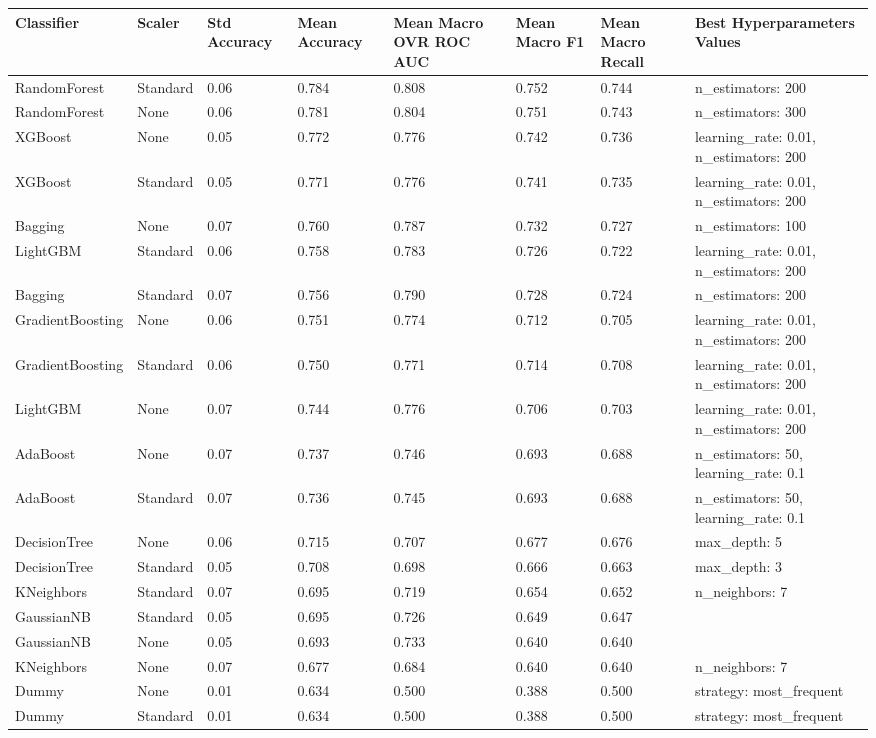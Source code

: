 \begin{tabular}{llllllll}
\toprule
Classifier & Scaler & Std Accuracy & Mean Accuracy & Mean Macro OVR ROC AUC & Mean Macro F1 & Mean Macro Recall & Best Hyperparameters Values \\
\midrule
RandomForest & Standard & 0.06 & 0.784 & 0.808 & 0.752 & 0.744 & {{n\_estimators: 200}} \\
RandomForest & None & 0.06 & 0.781 & 0.804 & 0.751 & 0.743 & {{n\_estimators: 300}} \\
XGBoost & None & 0.05 & 0.772 & 0.776 & 0.742 & 0.736 & {{learning\_rate: 0.01,  n\_estimators: 200}} \\
XGBoost & Standard & 0.05 & 0.771 & 0.776 & 0.741 & 0.735 & {{learning\_rate: 0.01,  n\_estimators: 200}} \\
Bagging & None & 0.07 & 0.760 & 0.787 & 0.732 & 0.727 & {{n\_estimators: 100}} \\
LightGBM & Standard & 0.06 & 0.758 & 0.783 & 0.726 & 0.722 & {{learning\_rate: 0.01,  n\_estimators: 200}} \\
Bagging & Standard & 0.07 & 0.756 & 0.790 & 0.728 & 0.724 & {{n\_estimators: 200}} \\
GradientBoosting & None & 0.06 & 0.751 & 0.774 & 0.712 & 0.705 & {{learning\_rate: 0.01,  n\_estimators: 200}} \\
GradientBoosting & Standard & 0.06 & 0.750 & 0.771 & 0.714 & 0.708 & {{learning\_rate: 0.01,  n\_estimators: 200}} \\
LightGBM & None & 0.07 & 0.744 & 0.776 & 0.706 & 0.703 & {{learning\_rate: 0.01,  n\_estimators: 200}} \\
AdaBoost & None & 0.07 & 0.737 & 0.746 & 0.693 & 0.688 & {{n\_estimators: 50,  learning\_rate: 0.1}} \\
AdaBoost & Standard & 0.07 & 0.736 & 0.745 & 0.693 & 0.688 & {{n\_estimators: 50,  learning\_rate: 0.1}} \\
DecisionTree & None & 0.06 & 0.715 & 0.707 & 0.677 & 0.676 & {{max\_depth: 5}} \\
DecisionTree & Standard & 0.05 & 0.708 & 0.698 & 0.666 & 0.663 & {{max\_depth: 3}} \\
KNeighbors & Standard & 0.07 & 0.695 & 0.719 & 0.654 & 0.652 & {{n\_neighbors: 7}} \\
GaussianNB & Standard & 0.05 & 0.695 & 0.726 & 0.649 & 0.647 & {{}} \\
GaussianNB & None & 0.05 & 0.693 & 0.733 & 0.640 & 0.640 & {{}} \\
KNeighbors & None & 0.07 & 0.677 & 0.684 & 0.640 & 0.640 & {{n\_neighbors: 7}} \\
Dummy & None & 0.01 & 0.634 & 0.500 & 0.388 & 0.500 & {{strategy: most\_frequent}} \\
Dummy & Standard & 0.01 & 0.634 & 0.500 & 0.388 & 0.500 & {{strategy: most\_frequent}} \\
\bottomrule
\end{tabular}

